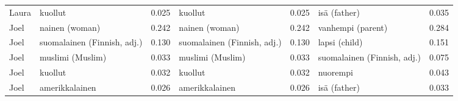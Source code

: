 \begin{longtable}{llrlrlr}
 Laura &                     kuollut &                            0.025 &                     kuollut &                                 0.025 &                isä (father) &                           0.035 \\
  Joel &              nainen (woman) &                            0.242 &              nainen (woman) &                                 0.242 &           vanhempi (parent) &                           0.284 \\
  Joel & suomalainen (Finnish, adj.) &                            0.130 & suomalainen (Finnish, adj.) &                                 0.130 &               lapsi (child) &                           0.151 \\
  Joel &            muslimi (Muslim) &                            0.033 &            muslimi (Muslim) &                                 0.033 & suomalainen (Finnish, adj.) &                           0.075 \\
  Joel &                     kuollut &                            0.032 &                     kuollut &                                 0.032 &                    nuorempi &                           0.043 \\
  Joel &              amerikkalainen &                            0.026 &              amerikkalainen &                                 0.026 &                isä (father) &                           0.033 \\
\end{longtable}
